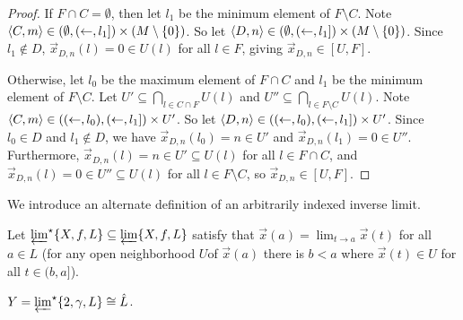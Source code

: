 \documentclass[11pt]{article}
\newcommand{\vect}{\vec}
\begin{document}
\begin{proof}
    If \(F\cap C=\emptyset\), then
    let \(l_1\) be the minimum element of \(F\setminus C\).
    Note \(\langle C,m\rangle\in(\emptyset,(\leftarrow,l_1])\times (M\setminus \{0\})\).
    So let \(\langle D,n\rangle\in(\emptyset,(\leftarrow,l_1])\times (M\setminus \{0\})\).
    Since \(l_1\not\in D\), \(\vect x_{D,n}(l)=0\in U(l)\) for all \(l\in F\),
    giving \(\vect x_{D,n}\in[U,F]\).

    Otherwise, let \(l_0\) be the maximum element of \(F\cap C\) and
    \(l_1\) be the minimum element of \(F\setminus C\).
    Let \(U'\subseteq \bigcap_{l\in C\cap F}U(l)\) and
    \(U''\subseteq \bigcap_{l\in F\setminus C}U(l)\).
    Note \(\langle C,m\rangle\in((\leftarrow,l_0),(\leftarrow,l_1])\times U'\).
    So let \(\langle D,n\rangle\in((\leftarrow,l_0),(\leftarrow,l_1])\times U'\).
    Since \(l_0\in D\) and \(l_1\not\in D\), we have
    \(\vect x_{D,n}(l_0)=n\in U'\) and
    \(\vect x_{D,n}(l_1)=0\in U''\). Furthermore,
    \(\vect x_{D,n}(l)=n\in U'\subseteq U(l)\) for all \(l\in F\cap C\), and
    \(\vect x_{D,n}(l)=0\in U''\subseteq U(l)\) for all \(l\in F\setminus C\),
    so \(\vect x_{D,n}\in[U,F]\).
  \end{proof}




















  \newpage

  We introduce an alternate definition of an arbitrarily indexed
  inverse limit.

  \begin{definition}
    Let \(\varprojlim^\star\{X,f,L\}\subseteq\varprojlim\{X,f,L\}\) satisfy
    that \(\vect x(a)=\lim_{t\to a}\vect x(t)\) for all \(a\in L\)
    (for any open neighborhood
    \(U\)of \(\vect x(a)\) there is \(b<a\) where \(\vect x(t)\in U\)
    for all \(t\in(b,a]\)).
  \end{definition}

  \begin{theorem}
    \(Y=\varprojlim^\star \{2, \gamma, L\}\cong \hat L\).
  \end{theorem}
\end{document}
